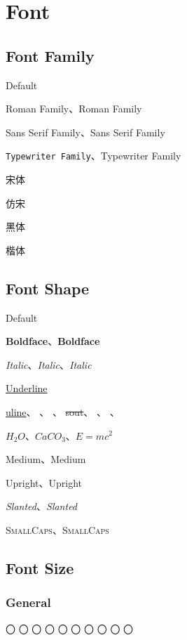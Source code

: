 \documentclass[UTF8]{ctexrep}
\begin{document}
\chapter{Font}


\section{Font Family}
\par Default
\par \textrm{Roman Family}、{\rmfamily Roman Family}
\par \textsf{Sans Serif Family}、{\sffamily Sans Serif Family}
\par \texttt{Typewriter Family}、{\ttfamily Typewriter Family}
\par {\songti 宋体}
\par {\fangsong 仿宋}
\par {\heiti 黑体}
\par {\kaishu 楷体}


\section{Font Shape}
\par Default
\par \textbf{Boldface}、{\bfseries Boldface}
\par \textit{Italic}、\emph{Italic}、{\itshape Italic}
\par \underline{Underline}
\par \uline{uline}、
    、
    、
    \sout{sout}、
    、
    、
\par $H_2O$、$CaCO_3$、$E=mc^2$
\par \textmd{Medium}、{\mdseries Medium}
\par \textup{Upright}、{\upshape Upright}
\par \textsl{Slanted}、{\slshape Slanted}
\par \textsc{SmallCaps}、{\scshape SmallCaps}


\section{Font Size}

\subsection{General}
\par
{\tiny 〇}
{\scriptsize 〇}
{\footnotesize 〇}
{\small 〇}
{\normalsize 〇} %
{\large 〇}
{\Large 〇}
{\LARGE 〇}
{\huge 〇}
{\Huge 〇}
\end{document}
